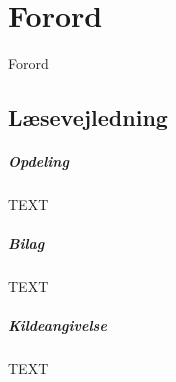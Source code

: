 \chapter*{Forord}
Forord

\section*{Læsevejledning}
\paragraph{Opdeling} TEXT

\paragraph{Bilag} TEXT

\paragraph{Kildeangivelse} TEXT

